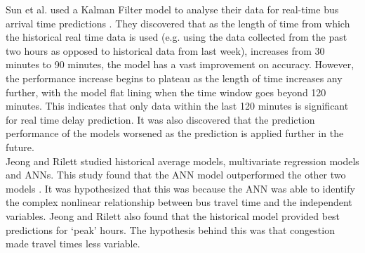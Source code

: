 Sun et al. used a Kalman Filter model to analyse their data for real-time bus arrival time predictions \cite{smart-public-transport}. They discovered that as the length of time from which the historical real time data is used (e.g. using the data collected from the past two hours as opposed to historical data from last week), increases from 30 minutes to 90 minutes, the model has a vast improvement on accuracy. However, the performance increase begins to plateau as the length of time increases any further, with the model flat lining when the time window goes beyond 120 minutes. This indicates that only data within the last 120 minutes is significant for real time delay prediction. It was also discovered that the prediction performance of the models worsened as the prediction is applied further in the future. \\

Jeong and Rilett studied historical average models, multivariate regression models and ANNs. This study found that the ANN model outperformed the other two models \cite{ann-prediction}. It was hypothesized that this was because the ANN was able to identify the complex nonlinear relationship between bus travel time and the independent variables. Jeong and Rilett also found that the historical model provided best predictions for `peak' hours. The hypothesis behind this was that congestion made travel times less variable.

